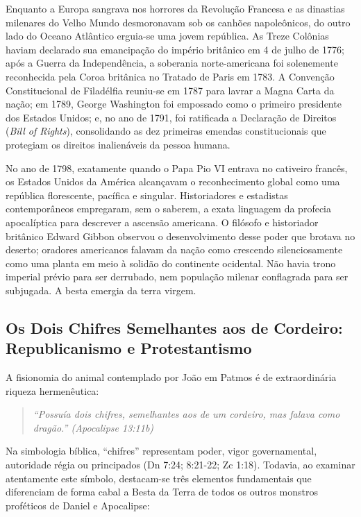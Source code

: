 \documentclass[11pt,a4paper,openany]{book}
\begin{document}
Enquanto a Europa sangrava nos horrores da Revolução Francesa e as dinastias milenares do Velho Mundo desmoronavam sob os canhões napoleônicos, do outro lado do Oceano Atlântico erguia-se uma jovem república. As Treze Colônias haviam declarado sua emancipação do império britânico em 4 de julho de 1776; após a Guerra da Independência, a soberania norte-americana foi solenemente reconhecida pela Coroa britânica no Tratado de Paris em 1783. A Convenção Constitucional de Filadélfia reuniu-se em 1787 para lavrar a Magna Carta da nação; em 1789, George Washington foi empossado como o primeiro presidente dos Estados Unidos; e, no ano de 1791, foi ratificada a Declaração de Direitos (\textit{Bill of Rights}), consolidando as dez primeiras emendas constitucionais que protegiam os direitos inalienáveis da pessoa humana.

No ano de 1798, exatamente quando o Papa Pio VI entrava no cativeiro francês, os Estados Unidos da América alcançavam o reconhecimento global como uma república florescente, pacífica e singular. Historiadores e estadistas contemporâneos empregaram, sem o saberem, a exata linguagem da profecia apocalíptica para descrever a ascensão americana. O filósofo e historiador britânico Edward Gibbon observou o desenvolvimento desse poder que brotava no deserto; oradores americanos falavam da nação como crescendo silenciosamente como uma planta em meio à solidão do continente ocidental. Não havia trono imperial prévio para ser derrubado, nem população milenar conflagrada para ser subjugada. A besta emergia da terra virgem.



\subsection{Os Dois Chifres Semelhantes aos de Cordeiro: Republicanismo e Protestantismo}


A fisionomia do animal contemplado por João em Patmos é de extraordinária riqueza hermenêutica:


\begin{quote}
\itshape \textit{``Possuía dois chifres, semelhantes aos de um cordeiro, mas falava como dragão.''} (Apocalipse 13:11b)
\end{quote}


Na simbologia bíblica, ``chifres'' representam poder, vigor governamental, autoridade régia ou principados (Dn 7:24; 8:21-22; Zc 1:18). Todavia, ao examinar atentamente este símbolo, destacam-se três elementos fundamentais que diferenciam de forma cabal a Besta da Terra de todos os outros monstros proféticos de Daniel e Apocalipse:
\end{document}
